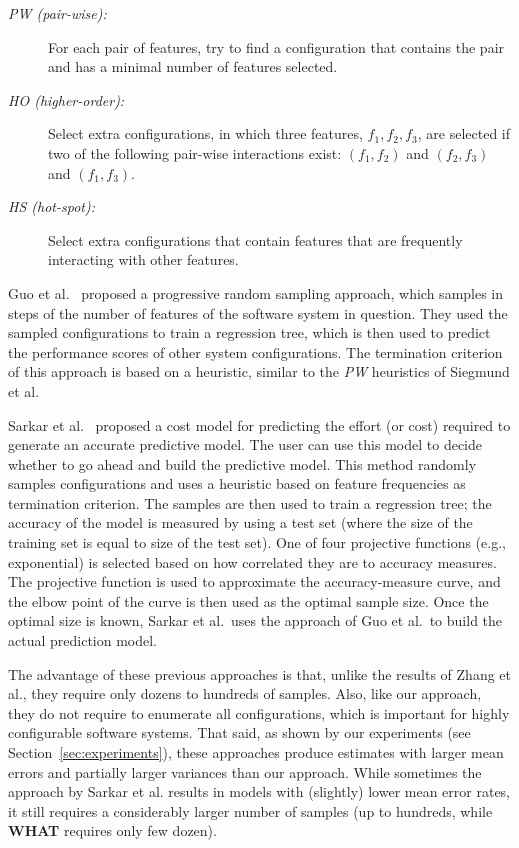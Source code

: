 \documentclass{newsig}
\newcommand{\what}{{\bf WHAT }}
\begin{document}
\begin{description}
\item[{\em PW (pair-wise):}] For each pair of features, try to find a configuration that contains the pair and has a minimal number of features selected. 
\item[{\em HO (higher-order):}] Select extra configurations, in which three features, $f_1,f_2,f_3$, are selected if two of the following pair-wise interactions exist: $(f_1,f_2)$ and $(f_2,f_3)$ and $(f_1,f_3)$.
\item[{\em HS (hot-spot):}] Select extra configurations that contain features that are
frequently interacting with other features. 
\end{description}


Guo et al.~\cite{guo2013variability} proposed a progressive random sampling approach, which samples in steps of the number of features of the software system in question. They used the sampled configurations to train a regression tree, which is then used to predict the performance scores of other system configurations. The termination criterion of this approach is based on a heuristic, similar to the {\em PW} heuristics of Siegmund et al. 

Sarkar et al.~\cite{sarkar2015cost} proposed a cost model for predicting the effort (or cost) required to generate an accurate predictive model. The user can use this model to decide whether to go ahead and build the predictive model. This method randomly samples configurations and uses a heuristic based on feature frequencies as termination criterion. The samples are then used to train a regression tree; the accuracy of the model is measured by using a test set (where the size of the training set is equal to size of the test set). One of four projective functions (e.g., exponential) is selected based on how correlated they are to  accuracy measures. The projective function is used to approximate the accuracy-measure curve, and the elbow point of the curve is then used as the optimal sample size. Once the optimal size is known, Sarkar et al.\ uses the approach of Guo et al.\ to build the actual prediction model.  


The advantage of these previous approaches is that, unlike  the results of Zhang et al., they require only dozens to hundreds of samples. Also, like our approach, they do not require to enumerate all configurations, which is important for highly configurable software systems. 
That said, as shown by our experiments (see Section~\ref{sec:experiments}), these approaches produce estimates with  larger mean errors and partially larger variances than our approach. While sometimes the approach by Sarkar et al. results in  models with (slightly)
lower mean error rates, it still requires a considerably larger number of samples (up to hundreds, while \what requires only few dozen).
\end{document}
